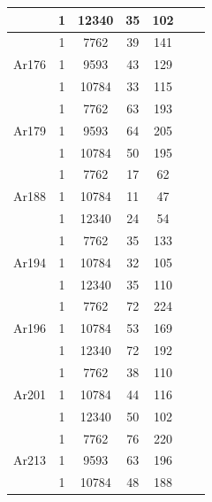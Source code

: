 \documentclass[../main.tex]{subfiles}
\begin{document}
\begin{table}[H]
\begin{center}
\begin{singlespace}
{\begin{tabular}{ |c|c|c|c|c|c|c| }
		& 1 & 12340 & 35 & 102 \\ 
		\hline
		\multirow{3}{4em}{Ar176} & 1 & 7762 & 39 & 141 \\ 
		& 1 & 9593 & 43 & 129  \\ 
		& 1 & 10784 & 33 & 115 \\ 
		\hline
		\multirow{3}{4em}{Ar179} & 1 & 7762 & 63 & 193 \\ 
		& 1 & 9593 & 64 & 205  \\ 
		& 1 & 10784 & 50 & 195 \\ 
		\hline
		\multirow{3}{4em}{Ar188} & 1 & 7762 & 17 & 62 \\ 
		& 1 & 10784 & 11 & 47  \\ 
		& 1 & 12340 & 24 & 54 \\ 
		\hline
		\multirow{3}{4em}{Ar194} & 1 & 7762 & 35 & 133 \\ 
		& 1 & 10784 & 32 & 105  \\ 
		& 1 & 12340 & 35 & 110 \\ 
		\hline
		\multirow{3}{4em}{Ar196} & 1 & 7762 & 72 & 224 \\ 
		& 1 & 10784 & 53 & 169  \\ 
		& 1 & 12340 & 72 & 192 \\ 
		\hline
		\multirow{3}{4em}{Ar201} & 1 & 7762 & 38 & 110 \\ 
		& 1 & 10784 & 44 & 116  \\ 
		& 1 & 12340 & 50 & 102 \\ 
		\hline
		\multirow{3}{4em}{Ar213} & 1 & 7762 & 76 & 220 \\ 
		& 1 & 9593 & 63 & 196  \\ 
		& 1 & 10784 & 48 & 188 \\ 
		\hline
	\end{tabular}
	}
	\end{singlespace}
\end{center}
\end{table}
\end{document}

